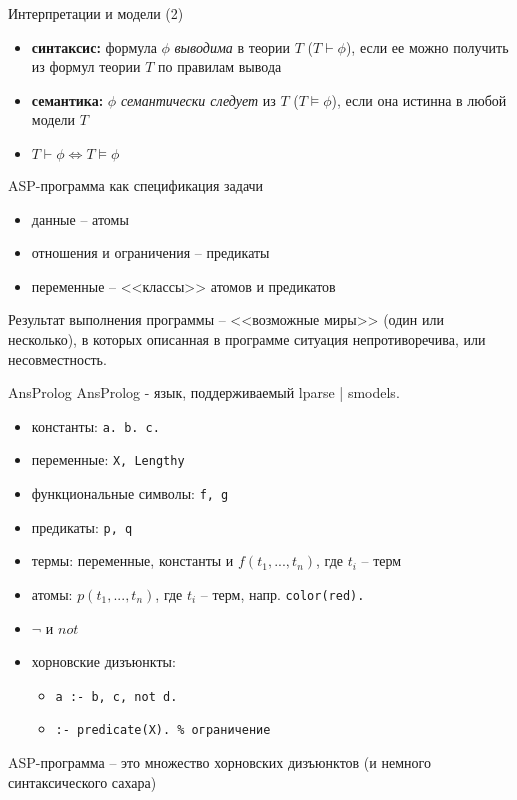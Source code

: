 \documentclass{beamer}
\begin{document}
\begin{frame}{Интерпретации и модели (2)}
\begin{itemize}
  \item \textbf{синтаксис:} формула $\phi$ \textit{выводима} в теории $T$ ($T \vdash \phi$), если ее можно получить из формул теории $T$ по правилам вывода
  \item \textbf{семантика:} $\phi$ \textit{семантически следует} из $T$ ($T \models \phi$), если она истинна в любой модели $T$
  \item $T \vdash \phi \Leftrightarrow T \models \phi$
\end{itemize}
\end{frame}

\begin{frame}{ASP-программа как спецификация задачи}
\begin{itemize}
  \item данные -- атомы
  \item отношения и ограничения -- предикаты
  \item переменные -- <<классы>> атомов и предикатов
\end{itemize}\bigskip
Результат выполнения программы -- <<возможные миры>> (один или несколько), в которых описанная в программе ситуация непротиворечива, или несовместность.
\end{frame}

\begin{frame}{AnsProlog}
AnsProlog - язык, поддерживаемый lparse | smodels.\bigskip
\begin{itemize}
  \item константы: \texttt{a. b. c.}
  \item переменные: \texttt{X, Lengthy}
  \item функциональные символы: \texttt{f, g}
  \item предикаты: \texttt{p, q}
  \item термы: переменные, константы и $f(t_1, ..., t_n)$, где $t_i$ -- терм
  \item атомы: $p(t_1, ..., t_n)$, где $t_i$ -- терм, напр. \texttt{color(red).}
  \item $\neg$ и $not$
  \item хорновские дизъюнкты:
    \begin{itemize}
      \item \texttt{a :- b, c, not d.}
      \item \texttt{:- predicate(X).    \% ограничение}
    \end{itemize}
\end{itemize}\bigskip
ASP-программа -- это множество хорновских дизъюнктов (и немного синтаксического сахара)
\end{frame}
\end{document}
